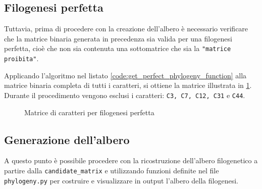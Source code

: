 \documentclass[11pt,italian]{article}
\begin{document}
\subsection{Filogenesi perfetta}
Tuttavia, prima di procedere con la creazione dell'albero è necessario verificare che la matrice binaria generata in precedenza sia valida per una filogenesi perfetta, cioè che non sia contenuta una sottomatrice che sia la \lstinline{"matrice proibita"}.

Applicando l'algoritmo nel listato \ref{code:get_perfect_phylogeny_function} alla matrice binaria completa di tutti i caratteri, si ottiene la matrice illustrata in \cref{fig:matrix-perfect-phylo}.
Durante il procedimento vengono esclusi i caratteri: \lstinline{C3, C7, C12, C31} e \lstinline{C44}.
\begin{figure}[]
  \caption{Matrice di caratteri per filogenesi perfetta}
  \label{fig:matrix-perfect-phylo}
\end{figure}

\subsection{Generazione dell'albero}
A questo punto è possibile procedere con la ricostruzione dell'albero filogenetico a partire dalla \lstinline{candidate_matrix} e utilizzando funzioni definite nel file \lstinline{phylogeny.py} per costruire e visualizzare in output l'albero della filogenesi.
\end{document}
